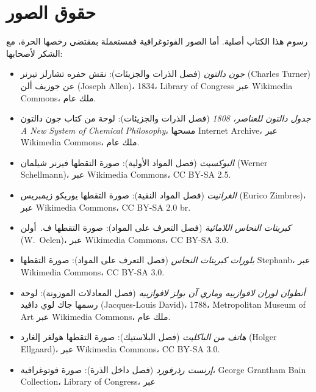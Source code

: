 \chapter*{حقوق الصور}

رسوم هذا الكتاب أصلية. أما الصور الفوتوغرافية فمستعملة بمقتضى
رخصها الحرة، مع الشكر لأصحابها:

\begin{itemize}
  \item \emph{جون دالتون} (فصل الذرات والجزيئات): نقش حفره
        تشارلز تيرنر (Charles Turner) عن جوزيف ألن (Joseph Allen)، 1834،
        Library of Congress عبر Wikimedia Commons، ملك عام.
  \item \emph{جدول دالتون للعناصر، 1808} (فصل الذرات
        والجزيئات): لوحة من كتاب جون دالتون \emph{A New System of Chemical
        Philosophy}، مسحها Internet Archive، عبر Wikimedia Commons،
        ملك عام.
  \item \emph{البوكسيت} (فصل المواد الأولية): صورة التقطها فيرنر
        شيلمان (Werner Schellmann)، عبر Wikimedia Commons، CC BY-SA 2.5.
  \item \emph{الغرانيت} (فصل المواد النقية): صورة التقطها يوريكو
        زيمبريس (Eurico Zimbres)، عبر Wikimedia Commons، CC BY-SA 2.0 br.
  \item \emph{كبريتات النحاس اللامائية} (فصل التعرف على المواد):
        صورة التقطها ف.~أولن (W.~Oelen)، عبر Wikimedia Commons، CC BY-SA 3.0.
  \item \emph{بلورات كبريتات النحاس} (فصل التعرف على المواد):
        صورة التقطها Stephanb، عبر Wikimedia Commons، CC BY-SA 3.0.
  \item \emph{أنطوان لوران لافوازييه وماري آن بولز لافوازييه}
        (فصل المعادلات الموزونة): لوحة رسمها جاك لوي دافيد (Jacques-Louis David)،
        1788، Metropolitan Museum of Art عبر Wikimedia Commons، ملك
        عام.
  \item \emph{هاتف من الباكليت} (فصل البلاستيك): صورة التقطها هولغر
        إلغارد (Holger Ellgaard)، عبر Wikimedia Commons، CC BY-SA 3.0.
  \item \emph{إرنست رذرفورد} (فصل داخل الذرة): صورة فوتوغرافية،
        George Grantham Bain Collection، Library of Congress، عبر

\end{itemize}
